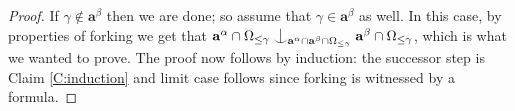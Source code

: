 \documentclass[a4paper]{amsart}
\theoremstyle{plain}
\theoremstyle{definition}
\theoremstyle{remark}
\numberwithin{equation}{section}
\newcommand{\forkindep}[1][]{%
  \mathrel{
    \mathop{
      \vcenter{
        \hbox{\oalign{\noalign{\kern-.3ex}\hfil$\vert$\hfil\cr
              \noalign{\kern-.7ex}
              $\smile$\cr\noalign{\kern-.3ex}}}
      }
    }\displaylimits_{#1}
  }
}
\newenvironment{claimproof}[1][\proofname]
  {%
    \proof[#1]%
      \renewcommand*\qedsymbol{$\square$ (claim)}%
  }
  {%
    \endproof%
  }
\newcounter{step}                   %
\DeclareMathOperator{\dcl}{dcl}
\begin{document}
\begin{proof}
\begin{claimproof}
If $\gamma\notin \mathbf{a}^\beta$ then we are done; so assume that $\gamma\in \mathbf{a}^\beta$ as well. In this case, by properties of forking we get that $\mathbf{a}^\alpha\cap  \Omega_{\leq \gamma}\forkindep[\mathbf{a}^\alpha\cap \mathbf{a}^\beta\cap \Omega_{\leq \gamma}]\mathbf{a}^\beta\cap\Omega_{\leq \gamma}$, which is what we wanted to prove.
\end{claimproof}
The proof now follows by induction: the successor step is Claim \ref{C:induction} and limit case follows since forking is witnessed by a formula.
%
%
%
\end{proof}
\end{document}
